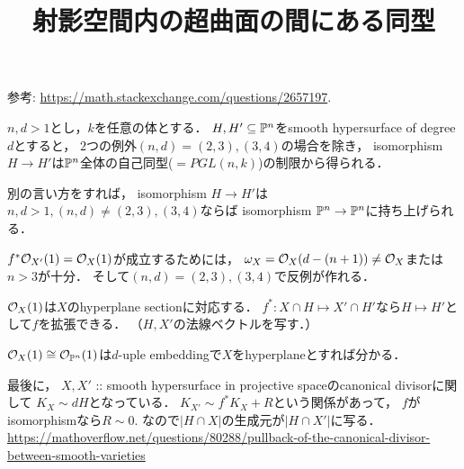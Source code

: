 \documentclass[a4paper]{jarticle}
\title{射影空間内の超曲面の間にある同型}
\begin{document}
\maketitle

参考: \url{https://math.stackexchange.com/questions/2657197}.
\begin{Thm}
    $n,d > 1$とし，$k$を任意の体とする．
    $H, H' \subseteq \mathbb{P}^n$をsmooth hypersurface of degree $d$とすると，
    $2$つの例外$(n,d)=(2,3), (3,4)$の場合を除き，
    isomorphism $H \to H'$は$\mathbb{P}^n$全体の自己同型($=PGL(n, k)$)の制限から得られる．
\end{Thm}
別の言い方をすれば，
isomorphism $H \to H'$は
$n,d>1, (n,d) \neq (2,3), (3,4)$ならば
isomorphism $\mathbb{P}^n \to \mathbb{P}^n$に持ち上げられる．

$f^* \mathcal{O}_{X'}(1)=\mathcal{O}_X(1)$が成立するためには，
$\omega_X=\mathcal{O}_{X}(d-(n+1)) \neq \mathcal{O}_X$または
$n>3$が十分．
そして$(n,d)=(2,3), (3,4)$で反例が作れる．

$\mathcal{O}_X(1)$は$X$のhyperplane sectionに対応する．
$f^*:X \cap H \mapsto X' \cap H'$なら$H \mapsto H'$として$f$を拡張できる．
（$H, X'$の法線ベクトルを写す．）

$\mathcal{O}_X(1) \cong \mathcal{O}_{\mathbb{P}^n}(1)$は$d$-uple embeddingで$X$をhyperplaneとすれば分かる．

最後に，
$X, X'$ :: smooth hypersurface in projective spaceのcanonical divisorに関して
$K_X \sim dH$となっている．
$K_{X'} \sim f^* K_{X}+R$という関係があって，
$f$がisomorphismなら$R \sim 0$.
なので$|H \cap X|$の生成元が$|H \cap X'|$に写る．
\url{https://mathoverflow.net/questions/80288/pullback-of-the-canonical-divisor-between-smooth-varieties}
\end{document}

